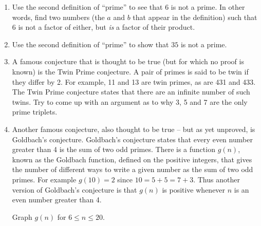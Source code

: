 \begin{enumerate}
\wbvfill


\item Use the second definition of ``prime'' to see that $6$ is
not a prime.  In other words, find two numbers (the $a$ and $b$ 
that appear in the definition) such that $6$ is not a factor of
either, but {\em is} a factor of their product.

\wbvfill


\item Use the second definition of ``prime'' to show that $35$ is
not a prime.

\wbvfill


\workbookpagebreak

\item A famous conjecture that is thought to be true (but
for which no proof is known) is the  
Twin Prime conjecture.
A pair of primes is said to be twin if they differ by 2.
For example, 11 and 13 are twin primes, as are 431 and 433.
The Twin Prime conjecture states that there are an infinite
number of such twins.  Try to come up with an argument as
to why 3, 5 and 7 are the only prime triplets.

\wbvfill




\item Another famous conjecture, also thought to be true -- but
as yet unproved, is 
Goldbach's conjecture.  Goldbach's conjecture
states that every even number greater than 4 is the sum of two odd
primes.  There is a function $g(n)$, known as the Goldbach function, defined
on the positive integers, that gives the number of different ways to 
write a given number as the sum of two odd primes.  For example $g(10) = 2$
since $10=5+5=7+3$.  Thus another version of Goldbach's conjecture
is that $g(n)$ is positive whenever $n$ is an even number greater than
4.

Graph $g(n)$ for $6 \leq n \leq 20$.

\wbvfill


\end{enumerate}
